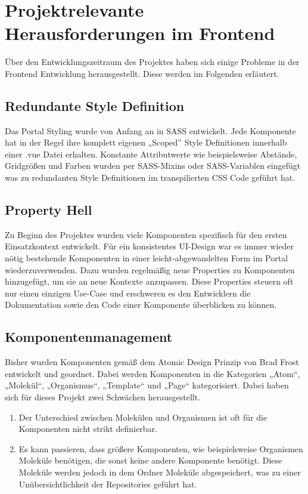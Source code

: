 \section{Projektrelevante Herausforderungen im Frontend}
\label{Projektrelevante Herausforderungen im Frontend}
Über den Entwicklungszeitraum des Projektes haben sich einige Probleme in der Frontend Entwicklung herausgestellt.
Diese werden im Folgenden erläutert.
 
\subsection{Redundante Style Definition}
Das Portal Styling wurde von Anfang an in SASS entwickelt. Jede Komponente hat in der Regel ihre komplett eigenen „Scoped” Style Definitionen innerhalb einer .vue Datei erhalten. Konstante Attributwerte wie beispielsweise Abstände, Gridgrößen und Farben wurden per SASS-Mixins oder SASS-Variablen eingefügt was zu redundanten Style Definitionen im transpilierten CSS Code geführt hat.
 
\subsection{Property Hell}
Zu Beginn des Projektes wurden viele Komponenten spezifisch für den ersten Einsatzkontext entwickelt. Für ein konsistentes UI-Design war es immer wieder nötig bestehende Komponenten in einer leicht-abgewandelten Form im Portal wiederzuverwenden. Dazu wurden regelmäßig neue Properties zu Komponenten hinzugefügt, um sie an neue Kontexte anzupassen. Diese Properties steuern oft nur einen einzigen Use-Case und erschweren es den Entwicklern die Dokumentation sowie den Code einer Komponente überblicken zu können.
 
\subsection{Komponentenmanagement}
Bisher wurden Komponenten gemäß dem Atomic Design Prinzip von Brad Frost entwickelt und geordnet. Dabei werden Komponenten in die Kategorien „Atom“, „Molekül“, „Organismus“, „Template“ und „Page“ kategorisiert. Dabei haben sich für dieses Projekt zwei Schwächen herausgestellt.
\begin{enumerate}
 \item Der Unterschied zwischen Molekülen und Organismen ist oft für die Komponenten nicht strikt definierbar.
 \item Es kann passieren, dass größere Komponenten, wie beispielsweise Organismen Moleküle benötigen, die sonst keine andere Komponente benötigt. Diese Moleküle werden jedoch in dem Ordner Moleküle abgespeichert, was zu einer Unübersichtlichkeit der Repositories geführt hat.
\end{enumerate}
 
